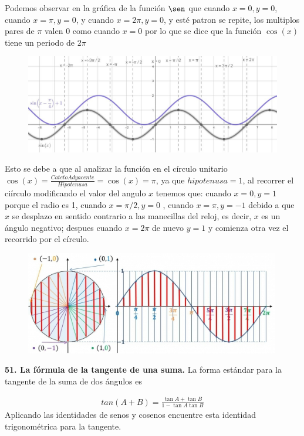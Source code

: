 \documentclass[12pt, letterpaper]{article}
\begin{document}
Podemos observar en la gráfica de la función $\sen$ que cuando $x = 0, y = 0$, cuando $x=\pi, y= 0$, y cuando $x = 2\pi, y= 0$, y esté patron se repite, los multiplos pares de $\pi$ valen 0 como cuando $x = 0$ por lo que se dice que la función $\cos (x)$ tiene un periodo de $2\pi$\\

\begin{figure}[ht]
\centering
\includegraphics[width=40em]{t7cuatro}
\end{figure}


Esto se debe a que al analizar la función en el círculo unitario $\cos (x) = \frac{CatetoAdyacente}{Hipotenusa} = \cos(x) = \pi$, ya que  $hipotenusa=1$, al recorrer el ciírculo modificando el valor del angulo $x$ tenemos que: cuando $x = 0, y=1$ porque el radio es 1,  cuando $x = \pi / 2, y = 0$ ,  cuando $x = \pi, y = -1$ debido a que $x$ se desplazo en sentido contrario a las manecillas del reloj, es decir, $x$ es un ángulo negativo; despues cuando $x=2\pi$ de nuevo $y=1$ y comienza otra vez el recorrido por el círculo.
\begin{figure}[ht]
\centering
\includegraphics[width=30em]{t7cinco}
\end{figure}

\textbf{51. La fórmula de la tangente de una suma.} La forma estándar para la tangente de la suma de dos ángulos es

\begin{align*}
	tan (A + B) =  \frac{\tan A + \tan B}{1 - \tan A \tan B}
\end{align*}
Aplicando las identidades de senos y cosenos encuentre esta identidad trigonométrica para la tangente.
\end{document}
